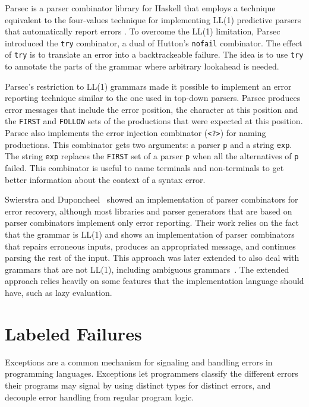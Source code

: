 \documentclass[3p,12pt,singlecolumn]{elsarticle}
\begin{document}
Parsec is a parser combinator library for Haskell that employs a
technique equivalent to the four-values technique for implementing
LL(1) predictive parsers that automatically report errors
\cite{leijen2001parsec}. To overcome the LL(1) limitation,
Parsec introduced the {\tt try} combinator, a dual of Hutton's
{\tt nofail} combinator. The effect of {\tt try}
is to translate an error into a backtrackeable
failure. The idea is
to use {\tt try} to annotate the parts of the grammar where
arbitrary lookahead is needed. 

Parsec's restriction to LL(1) grammars made it possible to implement
an error reporting technique similar to the one
used in top-down parsers.
Parsec produces error messages that include the error position,
the character at this position and the \texttt{FIRST} and
\texttt{FOLLOW} sets of the
productions that were expected at this position.
Parsec also implements the error injection combinator (\texttt{<?>})
for naming productions.
This combinator gets two arguments: a parser \texttt{p} and a
string \texttt{exp}.
The string \texttt{exp} replaces the \texttt{FIRST} set of a
parser \texttt{p} when all the alternatives of \texttt{p} failed.
This combinator is useful to name terminals and non-terminals to
get better information about the context of a syntax error.

Swierstra and Duponcheel~\cite{swierstra1996dec} showed an
implementation of parser combinators for error recovery,
although most libraries and parser generators that are based
on parser combinators implement only error reporting.
Their work relies on the fact that the grammar is LL(1)
and shows an implementation of parser combinators that
repairs erroneous inputs, produces an appropriated message,
and continues parsing the rest of the input.
This approach was later extended to also deal with grammars
that are not LL(1), including ambiguous grammars~\cite{swierstra2009uuparsing}.
The extended approach relies heavily on some features that the
implementation language should have, such as lazy evaluation.


\section{Labeled Failures} \label{sec:lf}

Exceptions are a common mechanism for signaling and handling
errors in programming languages.
Exceptions let programmers classify the different errors their
programs may signal by using distinct types for distinct errors,
and decouple error handling from regular program logic.
\end{document}
